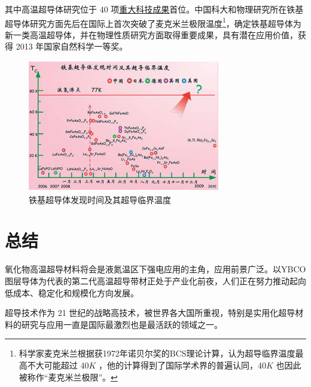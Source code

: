 \documentclass[UTF8, twocolumn]{ctexart}
\begin{document}
    其中高温超导体研究位于 40 项\href{http://www.bulletin.cas.cn/publish_article/2018/12/20181202.htm}{重大科技成果}首位。中国科大和物理研究所在铁基超导体研究方面先后在国际上首次突破了麦克米兰极限温度\footnote{科学家麦克米兰根据获1972年诺贝尔奖的BCS理论计算，认为超导临界温度最高不大可能超过 40$K$ ，他的计算得到了国际学术界的普遍认同，40$K$ 也因此被称作“麦克米兰极限”。}，确定铁基超导体为新一类高温超导体，并在物理性质研究方面取得重要成果，具有潜在应用价值，获得 2013 年国家自然科学一等奖。

    \begin{figure}[h]
        \centering
        \includegraphics[scale=0.8]{image/铁基超导体.jpg}
        \caption{铁基超导体发现时间及其超导临界温度}
        \label{fig:image4}
    \end{figure}

\section{总结}

    氧化物高温超导材料将会是液氮温区下强电应用的主角，应用前景广泛。以YBCO图层导体为代表的第二代高温超导带材正处于产业化前夜，人们正在努力推动起向低成本、稳定化和规模化方向发展\cite{马衍伟2015实用化超导材料研究进展与展望}。

    超导技术作为 21 世纪的战略高技术，被世界各大国所重视，特别是实用化超导材料的研究与应用一直是国际最激烈也是最活跃的领域之一。

\kaishu
{}

\end{document}
